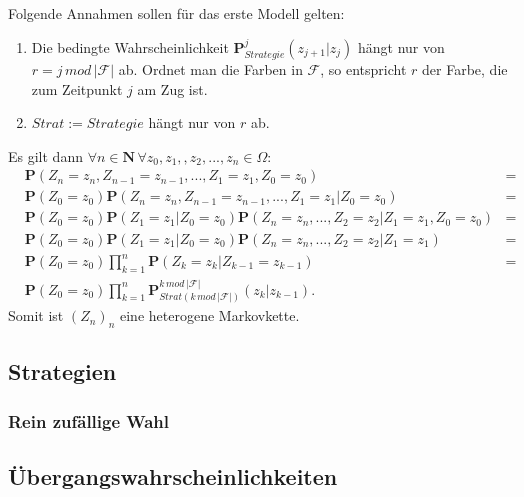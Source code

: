 \documentclass[12pt, letterpaper]{article}
\begin{document}
    
    Folgende Annahmen sollen für das erste Modell gelten:
    \begin{enumerate}
        \item Die bedingte Wahrscheinlichkeit $\mathbf{P}_{Strategie}^{j}(z_{j+1}|z_{j})$ hängt nur von $r = j\, mod\, |\mathcal{F}|$ ab. Ordnet man die Farben in $\mathcal{F}$, so entspricht $r$ der Farbe, die zum Zeitpunkt $j$ am Zug ist. 
        \item $Strat:=Strategie$ hängt nur von $r$ ab. 
    \end{enumerate}
    Es gilt dann $\forall n\in\mathbf{N}\,\forall z_0,z_1,,z_2,...,z_n\in\Omega$:
    \begin{align*}
        &\mathbf{P}(Z_n=z_n,Z_{n-1}=z_{n-1},...,Z_1=z_1,Z_0=z_0) &=\\
        &\mathbf{P}(Z_0=z_0)\mathbf{P}(Z_n=z_n,Z_{n-1}=z_{n-1},...,Z_1=z_1|Z_0=z_0) &=\\
        &\mathbf{P}(Z_0=z_0)\mathbf{P}(Z_1=z_1|Z_0=z_0)\mathbf{P}(Z_n=z_n,...,Z_2=z_2|Z_1=z_1,Z_0=z_0) &=\\
        &\mathbf{P}(Z_0=z_0)\mathbf{P}(Z_1=z_1|Z_0=z_0)\mathbf{P}(Z_n=z_n,...,Z_2=z_2|Z_1=z_1) &=\\
        &\mathbf{P}(Z_0=z_0)\prod_{k=1}^{n}\mathbf{P}(Z_k=z_k|Z_{k-1}=z_{k-1}) &=\\
        &\mathbf{P}(Z_0=z_0)\prod_{k=1}^{n}\mathbf{P}_{Strat(k\,mod\,|\mathcal{F}|)}^{k\,mod\,|\mathcal{F}|}(z_k|z_{k-1}).
    \end{align*}
    Somit ist $(Z_n)_n$ eine heterogene Markovkette.

    \subsection{Strategien}
    
    \subsubsection{Rein zufällige Wahl}
    
    \subsection{Übergangswahrscheinlichkeiten}
    
\end{document}

